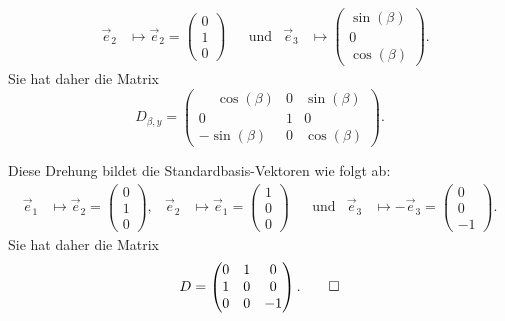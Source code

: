 \begin{loesung}
\begin{teilaufgaben}
\[\begin{aligned}
&
\vec e_2&\mapsto \vec e_2 = \begin{pmatrix}0\\1\\0\end{pmatrix}
&&\text{und}
&
\vec e_3&\mapsto \begin{pmatrix}\sin(\beta)\\0\\\cos(\beta)\end{pmatrix}.
\end{aligned}
\]
Sie hat daher die Matrix
\[
D_{\beta,y}
=
\begin{pmatrix}
\phantom{-}\cos(\beta)&0& \sin(\beta)\\
0&1& 0 \\
-\sin(\beta)&0&\cos(\beta)
\end{pmatrix}.
\]
\item Diese Drehung bildet die Standardbasis-Vektoren wie folgt ab:
\[
\begin{aligned}
\vec e_1&\mapsto \vec e_2 = \begin{pmatrix}0\\1\\0\end{pmatrix},
&
\vec e_2&\mapsto \vec e_1 = \begin{pmatrix}1\\0\\0\end{pmatrix}
&&\text{und}
&
\vec e_3&\mapsto -\vec e_3  = \begin{pmatrix}0\\0\\-1\end{pmatrix}.
\end{aligned}
\]
Sie hat daher die Matrix
\[
D
=
\begin{pmatrix}
0&1& 0\\
1&0& 0\\
0&0&-1
\end{pmatrix}.
\qedhere
\]
\end{teilaufgaben}
\end{loesung}


